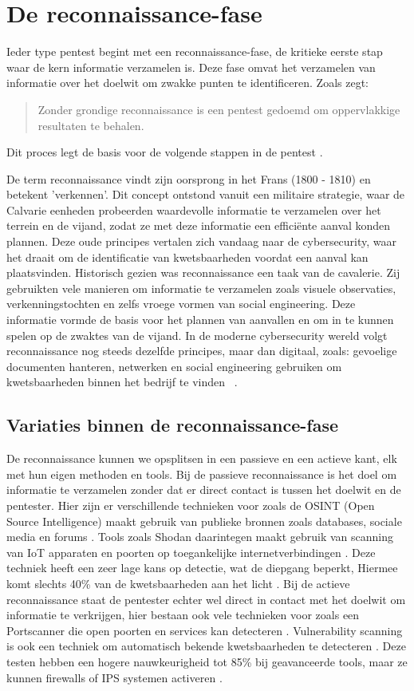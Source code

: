 \section{De reconnaissance-fase}
Ieder type pentest begint met een reconnaissance-fase, de kritieke eerste stap waar de kern informatie verzamelen is. 
Deze fase omvat het verzamelen van informatie over het doelwit om zwakke punten te identificeren. 
Zoals \textcite{Shah} zegt: \begin{quote}Zonder grondige reconnaissance is een pentest gedoemd om oppervlakkige resultaten te behalen. \end{quote}
Dit proces legt de basis voor de volgende stappen in de pentest \autocite{Kothia}.

De term reconnaissance vindt zijn oorsprong in het Frans (1800 - 1810) en betekent 'verkennen'. 
Dit concept ontstond vanuit een militaire strategie, waar de Calvarie eenheden probeerden waardevolle informatie te verzamelen over het terrein en de vijand, zodat ze met deze informatie een efficiënte aanval konden plannen.
Deze oude principes vertalen zich vandaag naar de cybersecurity, waar het draait om de identificatie van kwetsbaarheden voordat een aanval kan plaatsvinden.
Historisch gezien was reconnaissance een taak van de cavalerie. Zij gebruikten vele manieren om informatie te verzamelen zoals visuele observaties, verkenningstochten en zelfs vroege vormen van social engineering. 
Deze informatie vormde de basis voor het plannen van aanvallen en om in te kunnen spelen op de zwaktes van de vijand.
In de moderne cybersecurity wereld volgt reconnaissance nog steeds dezelfde principes, maar dan digitaal, zoals: gevoelige documenten hanteren, netwerken en social engineering gebruiken om kwetsbaarheden binnen het bedrijf te vinden ~\autocite{Joseph2013}.

\subsection{Variaties binnen de reconnaissance-fase}
De reconnaissance kunnen we opsplitsen in een passieve en een actieve kant, elk met hun eigen methoden en tools. 
Bij de passieve reconnaissance is het doel om informatie te verzamelen zonder dat er direct contact is tussen het doelwit en de pentester.
Hier zijn er verschillende technieken voor zoals de OSINT (Open Source Intelligence) maakt gebruik van publieke bronnen zoals databases, sociale media en forums \autocite{Dalalana2017}. 
Tools zoals Shodan daarintegen maakt gebruik van scanning van IoT apparaten en poorten op toegankelijke internetverbindingen \autocite{Monero2025}.
Deze techniek heeft een zeer lage kans op detectie, wat de diepgang beperkt, Hiermee komt slechts 40\% van de kwetsbaarheden aan het licht \parencite{Mahin2014}.
Bij de actieve reconnaissance staat de pentester echter wel direct in contact met het doelwit om informatie te verkrijgen, hier bestaan ook vele technieken voor zoals een Portscanner die open poorten en services kan detecteren \autocite{Mahin2014}. 
Vulnerability scanning is ook een techniek om automatisch bekende kwetsbaarheden te detecteren \autocite{GOEL2015}. 
Deze testen hebben een hogere nauwkeurigheid tot 85\% bij geavanceerde tools, maar ze kunnen firewalls of IPS systemen activeren \parencite{Altulaihan2023}.

